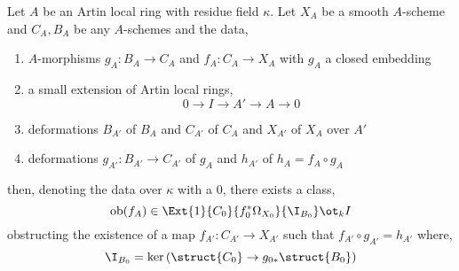 \documentclass[12pt]{article}
\begin{document}
\begin{lemma} \label{def_theory}
Let $A$ be an Artin local ring with residue field $\kappa$. Let $X_A$ be a smooth $A$-scheme and $C_A, B_A$ be any $A$-schemes and the data,
\begin{enumerate}
\item $A$-morphisms $g_A : B_A \to C_A$ and $f_A : C_A \to X_A$ with $g_A$ a closed embedding

\item a small extension of Artin local rings,
\[ 0 \to I \to A' \to A \to 0 \]

\item deformations $B_{A'}$ of $B_A$ and $C_{A'}$ of $C_A$ and $X_{A'}$ of $X_A$ over $A'$

\item deformations $g_{A'} : B_{A'} \to C_{A'}$ of $g_A$ and $h_{A'}$ of $h_{A} = f_A \circ g_A$
\end{enumerate}
then, denoting the data over $\kappa$ with a $0$, there exists a class,
\[ \ob(f_A) \in \Ext{1}{C_0}{f_0^* \Omega_{X_0}}{\I_{B_0}} \ot_k I \]
obstructing the existence of a map $f_{A'} : C_{A'} \to X_{A'}$ such that $f_{A'} \circ g_{A'} = h_{A'}$ where,
\[ \I_{B_0} = \ker{(\struct{C_0} \to g_{0*} \struct{B_0})} \]
\end{lemma}
\end{document}
